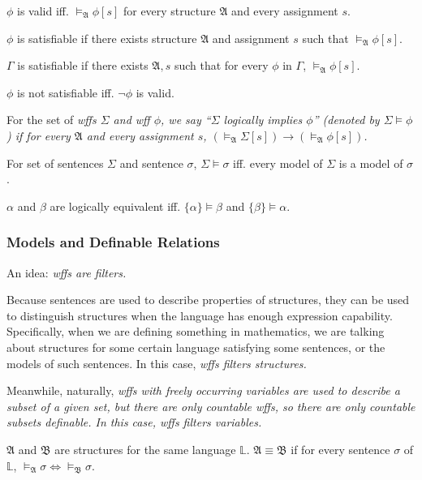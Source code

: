 \documentclass{article}
\begin{document}
 $\phi$ is valid iff. $\vDash_{\mathfrak{A}} \phi[s]$ for every structure $\mathfrak{A}$ and every assignment $s$.

 $\phi$ is satisfiable if there exists structure $\mathfrak{A}$ and assignment $s$ such that $\vDash_{\mathfrak{A}} \phi[s]$.

 $\Gamma$ is satisfiable if there exists $\mathfrak{A}, s$ such that for every $\phi$ in $\Gamma$, $\vDash_{\mathfrak{A}} \phi[s]$.

\Thm {} $\phi$ is not satisfiable iff. $\neg\phi$ is valid.

	For the set of \it{wff}s $\Sigma$ and \it{wff} $\phi$, we say ``$\Sigma$ logically implies $\phi$'' (denoted by $\Sigma \vDash \phi$) if for every $\mathfrak{A}$ and every assignment $s$, $\left( \vDash_{\mathfrak{A}} \Sigma[s] \right) \to \left( \vDash_{\mathfrak{A}} \phi[s] \right)$.
	
\Thm {}
	For set of sentences $\Sigma$ and sentence $\sigma$, $\Sigma \vDash \sigma$ iff. every model of $\Sigma$ is a model of $\sigma$.
	
	$\alpha$ and $\beta$ are logically equivalent iff. $\{\alpha\} \vDash \beta$ and $\{\beta\} \vDash \alpha$.




\subsubsection{Models and Definable Relations}

An idea: \it{wff}s are filters.

Because sentences are used to describe properties of structures, they can be used to distinguish structures when the language has enough expression capability. Specifically, when we are defining something in mathematics, we are talking about structures for some certain language satisfying some sentences, or the models of such sentences. In this case, \it{wff}s filters structures.

Meanwhile, naturally, \it{wff}s with freely occurring variables are used to describe a subset of a given set, but there are only countable \it{wff}s, so there are only countable subsets definable. In this case, \it{wff}s filters variables.


	$\mathfrak{A}$ and $\mathfrak{B}$ are structures for the same language $\mathbb{L}$. $\mathfrak{A} \equiv \mathfrak{B}$ if for every sentence $\sigma$ of $\mathbb{L}$, $\vDash_{\mathfrak{A}} \sigma \Leftrightarrow \vDash_{\mathfrak{B}} \sigma$.
	
\end{document}
